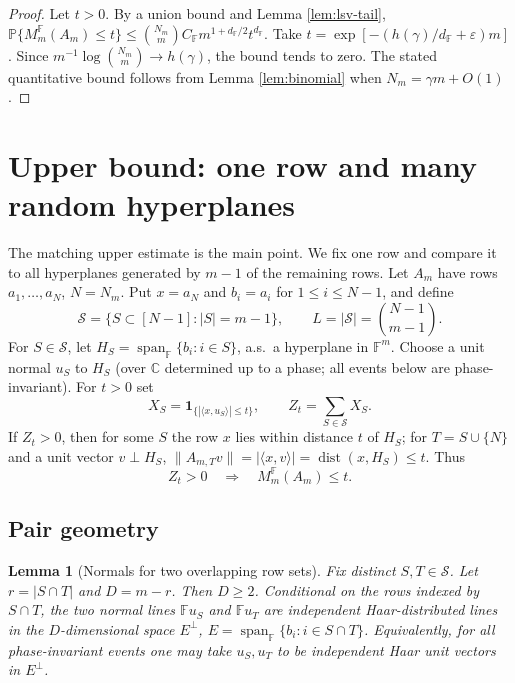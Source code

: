 \documentclass[preprint,12pt]{elsarticle}
\newtheorem{lemma}[theorem]{Lemma}
\DeclareMathOperator{\dist}{dist}
\newcommand{\C}{\mathbb{C}}
\newcommand{\F}{\mathbb{F}}
\newcommand{\PP}{\mathbb{P}}
\newcommand{\cS}{\mathcal{S}}
\begin{document}
\begin{proof}
Let $t>0$. By a union bound and Lemma \ref{lem:lsv-tail},
$\PP\{M_m^\F(A_m)\le t\}\le \binom{N_m}{m} C_\F m^{1+d_\F/2}t^{d_\F}$. Take
$t=\exp[-(h(\gamma)/d_\F+\varepsilon)m]$. Since $m^{-1}\log \binom{N_m}{m}\to h(\gamma)$, the bound
tends to zero. The stated quantitative bound follows from Lemma \ref{lem:binomial} when
$N_m=\gamma m+O(1)$.
\end{proof}

\section{Upper bound: one row and many random hyperplanes}

The matching upper estimate is the main point. We fix one row and compare it to all hyperplanes
generated by $m-1$ of the remaining rows. Let $A_m$ have rows $a_1,\ldots,a_N$, $N=N_m$. Put
$x=a_N$ and $b_i=a_i$ for $1\le i\le N-1$, and define
\[
  \cS=\{S\subset[N-1]: |S|=m-1\},\qquad L=|\cS|=\binom{N-1}{m-1}.
\]
For $S\in\cS$, let $H_S=\operatorname{span}_\F\{b_i:i\in S\}$, a.s.\ a hyperplane in $\F^m$. Choose a
unit normal $u_S$ to $H_S$ (over $\C$ determined up to a phase; all events below are phase-invariant).
For $t>0$ set
\begin{equation}\label{eq:Z-def}
  X_S=\mathbf1_{\{|\langle x,u_S\rangle|\le t\}},
  \qquad Z_t=\sum_{S\in\cS}X_S.
\end{equation}
If $Z_t>0$, then for some $S$ the row $x$ lies within distance $t$ of $H_S$; for $T=S\cup\{N\}$ and a
unit vector $v\perp H_S$, $\|A_{m,T}v\|=|\langle x,v\rangle|=\dist(x,H_S)\le t$. Thus
\begin{equation}\label{eq:Z-implies}
  Z_t>0\quad\Longrightarrow\quad M_m^\F(A_m)\le t.
\end{equation}

\subsection{Pair geometry}

\begin{lemma}[Normals for two overlapping row sets]\label{lem:normals}
Fix distinct $S,T\in\cS$. Let $r=|S\cap T|$ and $D=m-r$. Then $D\ge2$. Conditional on the rows indexed
by $S\cap T$, the two normal lines $\F u_S$ and $\F u_T$ are independent Haar-distributed lines in the
$D$-dimensional space $E^\perp$, $E=\operatorname{span}_\F\{b_i:i\in S\cap T\}$. Equivalently, for all
phase-invariant events one may take $u_S,u_T$ to be independent Haar unit vectors in $E^\perp$.
\end{lemma}
\end{document}
